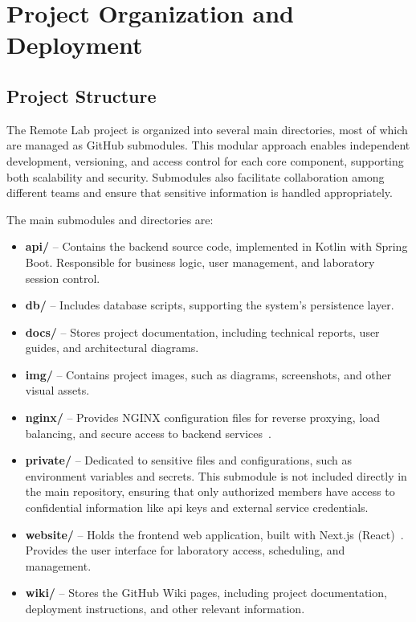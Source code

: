 \chapter{Project Organization and Deployment} \label{cap:project_org_deployment}

\section{Project Structure}

The Remote Lab project is organized into several main directories, most of which are managed as GitHub submodules. This modular approach enables independent development, versioning, and access control for each core component, supporting both scalability and security. Submodules also facilitate collaboration among different teams and ensure that sensitive information is handled appropriately.

The main submodules and directories are:

\begin{itemize}
    \item \textbf{api/} – Contains the backend source code, implemented in Kotlin with Spring Boot. Responsible for business logic, user management, and laboratory session control.
    \item \textbf{db/} – Includes database scripts, supporting the system's persistence layer.
    \item \textbf{docs/} – Stores project documentation, including technical reports, user guides, and architectural diagrams.
    \item \textbf{img/} – Contains project images, such as diagrams, screenshots, and other visual assets.
    \item \textbf{nginx/} – Provides NGINX configuration files for reverse proxying, load balancing, and secure access to backend services~\cite{nginx-docs}.
    \item \textbf{private/} – Dedicated to sensitive files and configurations, such as environment variables and secrets. This submodule is not included directly in the main repository, ensuring that only authorized members have access to confidential information like \ac{api} keys and external service credentials.
    \item \textbf{website/} – Holds the frontend web application, built with Next.js (React)~\cite{nextjs-docs}. Provides the user interface for laboratory access, scheduling, and management.
    \item \textbf{wiki/} – Stores the GitHub Wiki pages, including project documentation, deployment instructions, and other relevant information.
\end{itemize}

